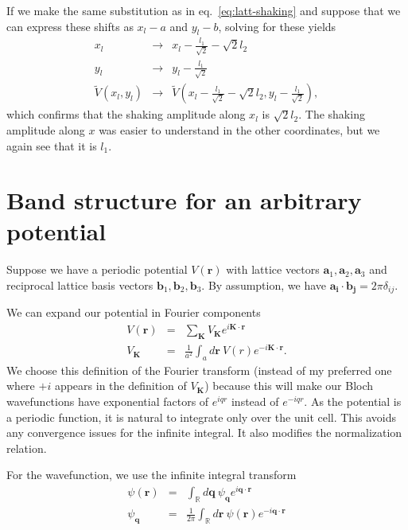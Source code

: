 \documentclass{article}
\theoremstyle{definition}
\begin{document}
If we make the same substitution as in eq.~\ref{eq:latt-shaking} and suppose that we can express these shifts as $x_l - a$ and $y_l - b$, solving for these yields
\begin{eqnarray}
x_l &\rightarrow& x_l - \frac{l_1}{\sqrt{2}} - \sqrt{2}l_2\\
y_l &\rightarrow& y_l - \frac{l_1}{\sqrt{2}}\\
\tilde{V}(x_l, y_l) &\rightarrow& \tilde{V}\left(x_l - \frac{l_1}{\sqrt{2}} - \sqrt{2}l_2, y_l - \frac{l_1}{\sqrt{2}}\right),
\end{eqnarray}
which confirms that the shaking amplitude along $x_l$ is $\sqrt{2}l_2$. The shaking amplitude along $x$ was easier to understand in the other coordinates, but we again see that it is $l_1$.

\section{Band structure for an arbitrary potential}

Suppose we have a periodic potential $V(\mathbf{r})$ with lattice vectors $\mathbf{a}_1, \mathbf{a}_2, \mathbf{a}_3$ and reciprocal lattice basis vectors $\mathbf{b}_1, \mathbf{b}_2, \mathbf{b}_3$. By assumption, we have $\mathbf{a_i} \cdot \mathbf{b_j} = 2 \pi \delta_{ij}$.

We can expand our potential in Fourier components
\begin{eqnarray}
V(\mathbf{r}) &=& \sum_\mathbf{K}  V_\mathbf{K} e^{i\mathbf{K} \cdot \mathbf{r}}\\
V_\mathbf{K} &=& \frac{1}{a^2} \int_a d\mathbf{r} \ V(r) e^{-i\mathbf{K} \cdot \mathbf{r}}.
\end{eqnarray}
We choose this definition of the Fourier transform (instead of my preferred one where $+i$ appears in the definition of $V_\mathbf{K}$) because this will make our Bloch wavefunctions have exponential factors of $e^{iqr}$ instead of $e^{-iqr}$. As the potential is a periodic function, it is natural to integrate only over the unit cell. This avoids any convergence issues for the infinite integral. It also modifies the normalization relation.

For the wavefunction, we use the infinite integral transform
\begin{eqnarray}
\psi(\mathbf{r}) &=& \int_\mathbb{R} d\mathbf{q} \ \psi_\mathbf{q} e^{i \mathbf{q} \cdot \mathbf{r}} \\
\psi_\mathbf{q} &=& \frac{1}{2\pi} \int_\mathbb{R} d\mathbf{r} \ \psi(\mathbf{r}) e^{-i \mathbf{q} \cdot \mathbf{r}}
\end{eqnarray}
\end{document}
